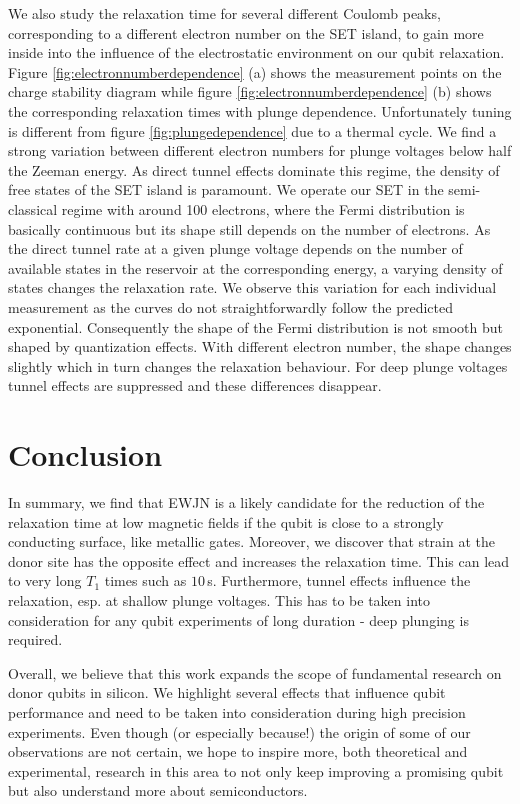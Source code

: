 \documentclass[%
 reprint,
 amsmath,amssymb,
 aps,
]{revtex4-1}
\begin{document}
We also study the relaxation time for several different Coulomb peaks, corresponding to a different electron number on the SET island, to gain more inside into the influence of the electrostatic environment on our qubit relaxation.  Figure \ref{fig:electronnumberdependence} (a) shows the measurement points on the charge stability diagram while figure \ref{fig:electronnumberdependence} (b) shows the corresponding relaxation times with plunge dependence. Unfortunately tuning is different from figure \ref{fig:plungedependence} due to a thermal cycle.  We find a strong variation between different electron numbers for plunge voltages below half the Zeeman energy. As direct tunnel effects dominate this regime, the density of free states of the SET island is paramount. We operate our SET in the semi-classical regime with around 100 electrons, where the Fermi distribution is basically continuous but its shape still depends on the number of electrons. As the direct tunnel rate at a given plunge voltage depends on the number of available states in the reservoir at the corresponding energy, a varying density of states changes the relaxation rate. We observe this variation for each individual measurement as the curves do not straightforwardly follow the predicted exponential. Consequently the shape of the Fermi distribution is not smooth but shaped by quantization effects. With different electron number, the shape changes slightly which in turn changes the relaxation behaviour. For deep plunge voltages tunnel effects are suppressed and these differences disappear. 


\section{\label{sec:conclusion}Conclusion}

In summary, we find that EWJN is a likely candidate for the reduction of the relaxation time at low magnetic fields if the qubit is close to a strongly conducting surface, like metallic gates. Moreover, we discover that strain at the donor site has the opposite effect and increases the relaxation time. This can lead to very long $T_1$ times such as $10\,$s. Furthermore, tunnel effects influence the relaxation, esp. at shallow plunge voltages. This has to be taken into consideration for any qubit experiments of long duration - deep plunging is required. 

Overall, we believe that this work expands the scope of fundamental research on donor qubits in silicon. We highlight several effects that influence qubit performance and need to be taken into consideration during high precision experiments. Even though (or especially because!) the origin of some of our observations are not certain, we hope to inspire more, both theoretical and experimental, research in this area to not only keep improving a promising qubit but also understand more about semiconductors. 

 
\end{document}
